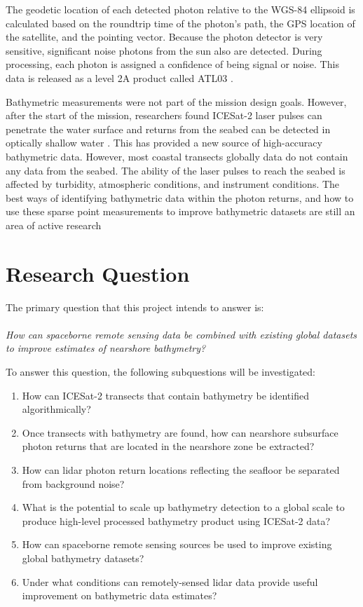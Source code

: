 The geodetic location of each detected photon relative to the WGS-84 ellipsoid is calculated based on the roundtrip time of the photon's path, the GPS location of the satellite, and the pointing vector. Because the photon detector is very sensitive, significant noise photons from the sun also are detected. During processing, each photon is assigned a confidence of being signal or noise. This data is released as a level 2A product called ATL03 \parencite{Neumann2019d}.

Bathymetric measurements were not part of the mission design goals. However, after the start of the mission, researchers found ICESat-2 laser pulses can penetrate the water surface and returns from the seabed can be detected in optically shallow water \parencite{Parrish2019}. This has provided a  new source of high-accuracy bathymetric data. However, most coastal transects globally data do not contain any data from the seabed. The ability of the laser pulses to reach the seabed is affected by turbidity, atmospheric conditions, and instrument conditions. The best ways of identifying bathymetric data within the photon returns, and how to use these sparse point measurements to improve bathymetric datasets are still an area of active research

\section{Research Question}
The primary question that this project intends to answer is: \\
\\
\emph{How can spaceborne remote sensing data be combined with existing global datasets to improve estimates of nearshore bathymetry?} 


To answer this question, the following subquestions will be investigated:

\begin{enumerate} 
      \item How can ICESat-2 transects that contain bathymetry be identified algorithmically?
      \item Once transects with bathymetry are found, how can nearshore subsurface photon returns that are located in the nearshore zone be extracted?
      \item How can lidar photon return locations reflecting the seafloor be separated from background noise?
      \item What is the potential to scale up bathymetry detection to a global scale to produce high-level processed bathymetry product using ICESat-2 data?
      \item How can spaceborne remote sensing sources be used to improve existing global bathymetry datasets?
      \item Under what conditions can remotely-sensed lidar data provide useful improvement on bathymetric data estimates?
\end{enumerate}
